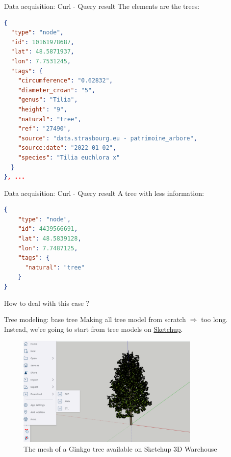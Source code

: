 \documentclass[10pt]{beamer}
\begin{document}
\begin{frame}[fragile]{Data acquisition: Curl - Query result}
 The elements are the trees:

\begin{lstlisting}[language=json]
{
  "type": "node",
  "id": 10161978687,
  "lat": 48.5871937,
  "lon": 7.7531245,
  "tags": {
    "circumference": "0.62832",
    "diameter_crown": "5",
    "genus": "Tilia",
    "height": "9",
    "natural": "tree",
    "ref": "27490",
    "source": "data.strasbourg.eu - patrimoine_arbore",
    "source:date": "2022-01-02",
    "species": "Tilia euchlora x"
  }
}, ...
\end{lstlisting}
\end{frame}

\begin{frame}[fragile]{Data acquisition: Curl - Query result}
  A tree with less information:

\begin{lstlisting}[language=json]
{
    "type": "node",
    "id": 4439566691,
    "lat": 48.5839128,
    "lon": 7.7487125,
    "tags": {
      "natural": "tree"
    }
}
\end{lstlisting}
\vfill
How to deal with this case ?
\end{frame}

\begin{frame}{Tree modeling: base tree}
Making all tree model from scratch $\Longrightarrow$ too long. \\
Instead, we're going to start from tree models on \href{https://app.sketchup.com/app}{Sketchup}.

\begin{figure}[H]
    \centering
        \centering
        \includegraphics[width=0.8\textwidth]{images/ginkgo_sketchup.png}
        \caption{The mesh of a Ginkgo tree available on Sketchup 3D Warehouse}
\end{figure}
\end{frame}
\end{document}
